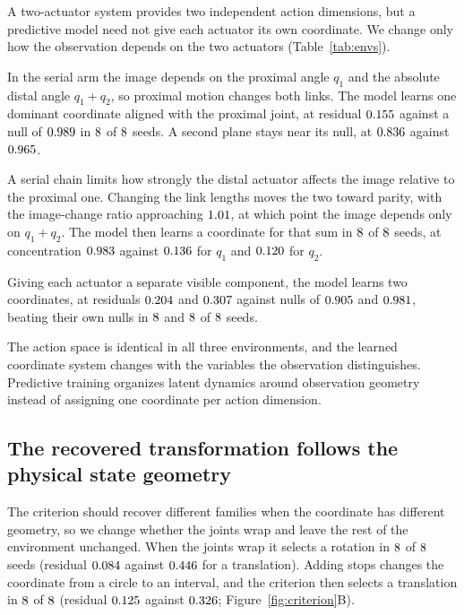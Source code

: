 \documentclass{article}
\begin{document}
A two-actuator system provides two independent action dimensions, but a predictive model need not give each actuator its own coordinate. We change only how the observation depends on the two actuators (Table~\ref{tab:envs}).

In the serial arm the image depends on the proximal angle $q_1$ and the absolute distal angle $q_1+q_2$, so proximal motion changes both links. The model learns one dominant coordinate aligned with the proximal joint, at residual $0.155$ against a null of $0.989$ in $8$ of $8$ seeds. A second plane stays near its null, at $0.836$ against $0.965$.

A serial chain limits how strongly the distal actuator affects the image relative to the proximal one. Changing the link lengths moves the two toward parity, with the image-change ratio approaching $1.01$, at which point the image depends only on $q_1+q_2$. The model then learns a coordinate for that sum in $8$ of $8$ seeds, at concentration $0.983$ against $0.136$ for $q_1$ and $0.120$ for $q_2$.

Giving each actuator a separate visible component, the model learns two coordinates, at residuals $0.204$ and $0.307$ against nulls of $0.905$ and $0.981$, beating their own nulls in $8$ and $8$ of $8$ seeds.

The action space is identical in all three environments, and the learned coordinate system changes with the variables the observation distinguishes. Predictive training organizes latent dynamics around observation geometry instead of assigning one coordinate per action dimension.

\subsection{The recovered transformation follows the physical state geometry}

The criterion should recover different families when the coordinate has different geometry, so we change whether the joints wrap and leave the rest of the environment unchanged. When the joints wrap it selects a rotation in $8$ of $8$ seeds (residual $0.084$ against $0.446$ for a translation). Adding stops changes the coordinate from a circle to an interval, and the criterion then selects a translation in $8$ of $8$ (residual $0.125$ against $0.326$; Figure~\ref{fig:criterion}B).
\end{document}
